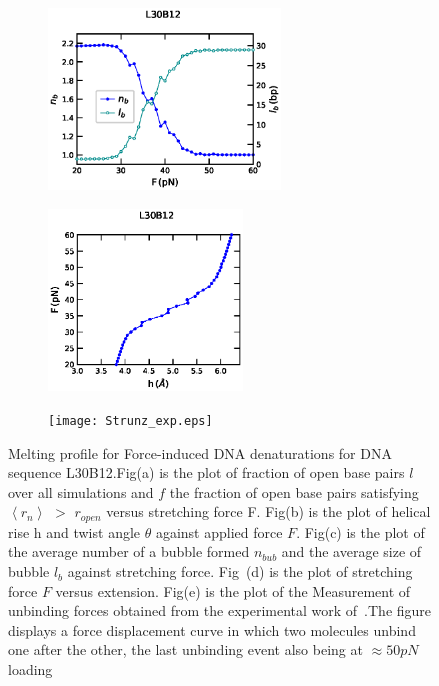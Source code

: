 \documentclass[12pt,masters,final]{UTRGVthesis}
\begin{document}
\begin{figure}[!h]
        \begin{subfigure}[b]{0.49\textwidth}
                \centering
                \includegraphics[scale=0.35,height=1.9in, width=.8\textwidth]{L30B12_Strunz_force_bub.eps}
                \caption{}
                \label{fig:L30B12bub}
        \end{subfigure}%
        \hspace{-0.5cm}
        \begin{subfigure}[b]{0.49\textwidth}
                \centering
                \includegraphics[scale=0.35,height=1.9in, width=.8\textwidth]{L30B12_Strunz_force_extension.eps}
                \caption{}
                \label{fig:L30B12extension}
        \end{subfigure}%
        
        \begin{subfigure}[b]{0.49\textwidth}
                \centering
                \texttt{[image: Strunz\_exp.eps]}
                \caption{}
                \label{fig:L30B12exp}
        \end{subfigure}%
       
\caption{\small Melting profile for Force-induced DNA denaturations for DNA sequence L30B12.Fig(a) is the plot of fraction of open base pairs $l$ over all simulations and $f$ the fraction of open base pairs satisfying $\left<r_n\right>$ $>$ $r_{open}$ versus stretching force F. Fig(b) is the plot of helical rise h and twist angle $\theta$ against applied force $F$. Fig(c) is the plot of the average number of a bubble formed  $n_{bub}$ and the average size of bubble $l_b$ against stretching force. Fig~(d) is the plot of stretching force $F$ versus extension. Fig(e) is the plot of the Measurement of unbinding forces obtained from the experimental work of~\protect\cite{Strunz:1999}.The figure displays a force displacement curve in which  two molecules unbind one after the other, the last unbinding event also being at $\approx 50pN$ loading }
\label{fig:L30B12}    

\end{figure}
\newpage
\end{document}
